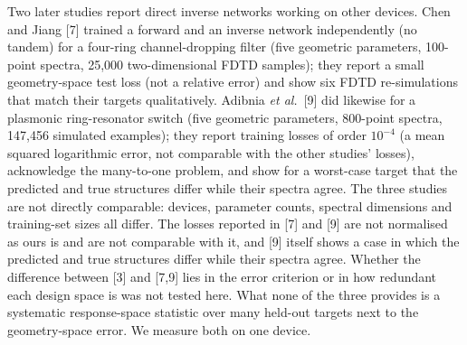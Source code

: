 \documentclass[11pt]{article}
\begin{document}
Two later studies report direct inverse networks working on other devices.
Chen and Jiang [7] trained a forward and an inverse network independently (no
tandem) for a four-ring channel-dropping filter (five geometric parameters,
100-point spectra, 25{,}000 two-dimensional FDTD samples); they report a small geometry-space test loss (not a relative error) and show six FDTD re-simulations that match their
targets qualitatively. Adibnia \emph{et al.}\ [9] did likewise for a plasmonic
ring-resonator switch (five geometric parameters, 800-point spectra, 147{,}456 simulated examples); they report training losses of order $10^{-4}$ (a mean squared logarithmic error, not comparable with the other studies' losses), acknowledge the many-to-one problem, and
show for a worst-case target that the predicted and true structures differ while
their spectra agree. The three studies are not directly comparable: devices,
parameter counts, spectral dimensions and training-set sizes all differ. The losses reported in [7] and [9] are not normalised as ours is and are not comparable with it, and [9] itself shows a case in which the predicted and true structures differ while their spectra agree. Whether the difference between [3] and [7,9] lies in the error criterion or in how redundant each design space is was not tested here. What none of the three provides
is a systematic response-space statistic over many held-out targets next to the
geometry-space error. We measure both on one device.
\end{document}
